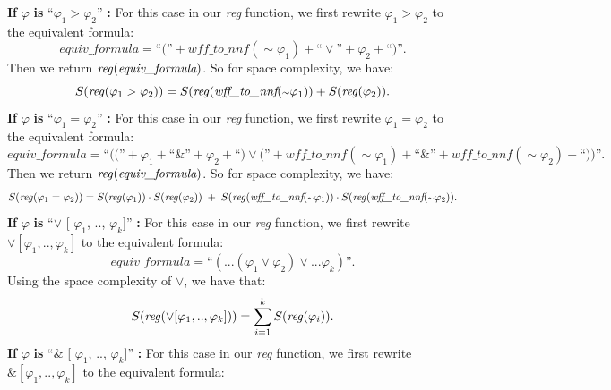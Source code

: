 \documentclass[runningheads]{llncs}
\renewcommand{\phi}{\varphi}
\begin{document}
\textbf{If} $\phi$ \textbf{is} ``$\phi_{1} >  \phi_{2}$'' \textbf{:}
    For this case in our \emph{reg} function, we first rewrite $\phi_{1} > \phi_{2}$ to the equivalent formula:
    \[ 
    \textit{equiv\_formula} = \text{``(''} + \textit{wff\_to\_nnf}(\scriptstyle{\sim}\textstyle \phi_{1}) + \text{``} \lor \text{''} + \phi_{2} + \text{``)''}.
    \]
    Then we return $\text{\emph{reg}}(\textit{equiv\_formula})$.
    So for space complexity, we have:
    \[ 
    S(\text{\emph{reg}}(\phi_{1} > \phi_{2})) = S(\text{\emph{reg}}(\textit{wff\_to\_nnf}(\scriptstyle{\sim}\textstyle \phi_{1})) + S(\text{\emph{reg}}(\phi_{2})).
    \]
\textbf{If} $\phi$ \textbf{is} ``$\phi_{1} = \phi_{2}$'' \textbf{:}
    For this case in our \emph{reg} function, we first rewrite $\phi_{1} = \phi_{2}$ to the equivalent formula:
    \[ 
    \textit{equiv\_formula} = 
    \text{``((''} + \phi_{1} + \text{``} \& \text{''} + \phi_{2} + \text{``)}
    \lor 
    \text{(''} + \textit{wff\_to\_nnf}(\scriptstyle{\sim}\textstyle \phi_{1}) + \text{``} \& \text{''} +  \textit{wff\_to\_nnf}(\scriptstyle{\sim}\textstyle \phi_{2}) + \text{``))''}.
    \]
    Then we return $\text{\emph{reg}}(\textit{equiv\_formula})$.
    So for space complexity, we have:
    \[ 
    S(\text{\emph{reg}}(\phi_{1} = \phi_{2})) =
    S(\text{\emph{reg}}(\phi_{1})) \cdot S(\text{\emph{reg}}(\phi_{2})) \; + \;  
    S(\text{\emph{reg}}(\textit{wff\_to\_nnf}(\scriptstyle{\sim}\textstyle \phi_{1})) \cdot S(\text{\emph{reg}}(\textit{wff\_to\_nnf}(\scriptstyle{\sim}\textstyle \phi_{2})).
    \]
\textbf{If} $\phi$ \textbf{is} ``$\lor$ [ $\phi_{1}$, .., $\phi_{k}$]'' \textbf{:} 
For this case in our \emph{reg} function, we first rewrite $\lor [\phi_{1}, .., \phi_{k}]$ to the equivalent formula:
    \[ 
    \textit{equiv\_formula} = \text{``}( ... (\phi_{1} \lor \phi_{2}) \lor ... \phi_{k})\text{''}.
    \]
Using the space complexity of $\lor$, we have that:
    \[
    S(\text{\emph{reg}}(\lor [\phi_{1}, .., \phi_{k}])) = 
    \sum_{i=1}^{k} S(\text{\emph{reg}}(\phi_{i})).
    \]
\textbf{If} $\phi$ \textbf{is} ``$\&$ [ $\phi_{1}$, .., $\phi_{k}$]'' \textbf{:} 
For this case in our \emph{reg} function, we first rewrite $\& [\phi_{1}, .., \phi_{k}]$ to the equivalent formula:
\end{document}
